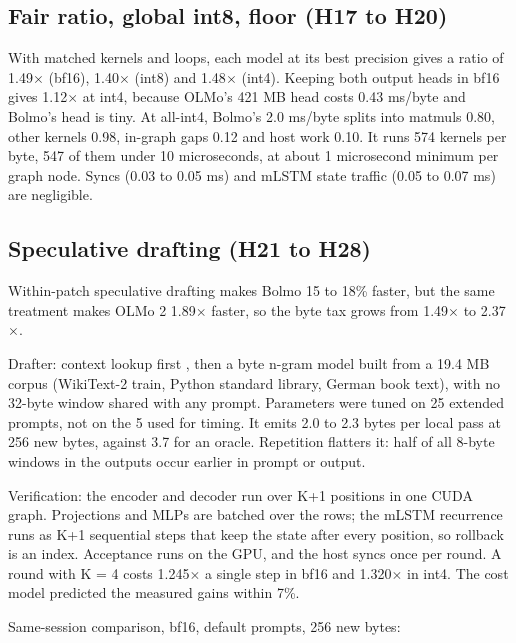 \documentclass[11pt,a4paper]{article}
\newcommand{\x}{\ensuremath{\times}}
\begin{document}
\subsection{Fair ratio, global int8, floor (H17 to H20)}\label{fair-ratio-global-int8-floor-h17-to-h20}

With matched kernels and loops, each model at its best precision gives a ratio of 1.49\x{} (bf16), 1.40\x{} (int8) and 1.48\x{} (int4). Keeping both output heads in bf16 gives 1.12\x{} at int4, because OLMo's 421 MB head costs 0.43 ms/byte and Bolmo's head is tiny. At all-int4, Bolmo's 2.0 ms/byte splits into matmuls 0.80, other kernels 0.98, in-graph gaps 0.12 and host work 0.10. It runs 574 kernels per byte, 547 of them under 10 microseconds, at about 1 microsecond minimum per graph node. Syncs (0.03 to 0.05 ms) and mLSTM state traffic (0.05 to 0.07 ms) are negligible.

\subsection{Speculative drafting (H21 to H28)}\label{speculative-drafting-h21-to-h28}

Within-patch speculative drafting \citep{leviathan2023speculative,chen2023speculative} makes Bolmo 15 to 18\% faster, but the same treatment makes OLMo 2 1.89\x{} faster, so the byte tax grows from 1.49\x{} to 2.37\x{}.

Drafter: context lookup first \citep{saxena2023promptlookup}, then a byte n-gram model built from a 19.4 MB corpus (WikiText-2 train, Python standard library, German book text), with no 32-byte window shared with any prompt. Parameters were tuned on 25 extended prompts, not on the 5 used for timing. It emits 2.0 to 2.3 bytes per local pass at 256 new bytes, against 3.7 for an oracle. Repetition flatters it: half of all 8-byte windows in the outputs occur earlier in prompt or output.

Verification: the encoder and decoder run over K+1 positions in one CUDA graph. Projections and MLPs are batched over the rows; the mLSTM recurrence runs as K+1 sequential steps that keep the state after every position, so rollback is an index. Acceptance runs on the GPU, and the host syncs once per round. A round with K = 4 costs 1.245\x{} a single step in bf16 and 1.320\x{} in int4. The cost model predicted the measured gains within 7\%.

Same-session comparison, bf16, default prompts, 256 new bytes:
\end{document}
